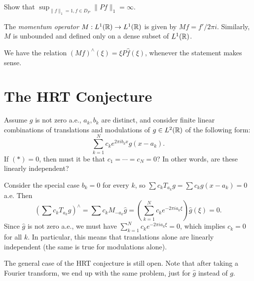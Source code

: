 \begin{exercise}
  Show that
  $\sup_{\|f\|_1 = 1, f \in D_P} \|P f\|_1 = \infty$.
\end{exercise}

\begin{definition}
  The \emph{momentum operator}
  $M : L^1(\mathbb{R}) \to L^1(\mathbb{R})$ is given by
  $M f = f' / 2\pi i$. Similarly,
  $M$ is unbounded and defined only on a
  dense subset of $L^1(\mathbb{R})$.
\end{definition}

\begin{remark}
  We have the relation
  $(Mf)^\wedge(\xi) = \xi P \widehat{f}(\xi)$,
  whenever the statement makes sense.
\end{remark}

\section{The HRT Conjecture}

\begin{conjecture}
  Assume $g$ is not zero a.e.,
  $a_k, b_k$ are distinct, and
  consider finite linear combinations of
  translations and modulations
  of $g \in L^2(\mathbb{R})$ of the following form:
  \[
    \sum_{k = 1}^N c_k e^{2\pi i b_k x} g(x - a_k). \tag{$*$}
  \]
  If $(*) = 0$, then must it be that
  $c_1 = \cdots = c_N = 0$? In other
  words, are these linearly
  independent?
\end{conjecture}

\begin{remark}
  Consider the special case $b_k = 0$
  for every $k$, so
  $\sum c_k T_{a_k} g = \sum c_k g(x - a_k) = 0$ a.e. Then
  \[
    \left(\sum c_k T_{a_k} g\right)^\wedge
    = \sum c_k M_{-a_k} \widehat{g}
    = \left(\sum_{k = 1}^N c_k e^{-2\pi i a_k \xi}\right)
    \widehat{g}(\xi) = 0.
  \]
  Since $\widehat{g}$ is not zero a.e., we
  must have
  $\sum_{k = 1}^N c_k e^{-2\pi i a_k \xi} = 0$,
  which implies $c_k = 0$ for all $k$.
  In particular, this means that
  translations alone are linearly independent
  (the same is true for modulations alone).
\end{remark}

\begin{remark}
  The general case of the HRT conjecture
  is still open. Note that after taking a
  Fourier transform, we end up with
  the same problem, just for $\widehat{g}$
  instead of $g$.
\end{remark}
